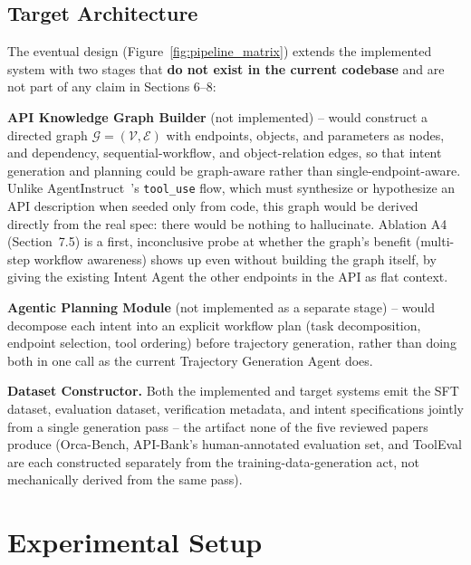 \documentclass[11pt]{article}
\begin{document}
\subsection{Target Architecture}
The eventual design (Figure~\ref{fig:pipeline_matrix}) extends the implemented system with two
stages that \textbf{do not exist in the current codebase} and are not part of any claim in
Sections 6--8:

\textbf{API Knowledge Graph Builder} (not implemented) -- would construct a directed graph
$\mathcal{G} = (\mathcal{V}, \mathcal{E})$ with endpoints, objects, and parameters as nodes, and
dependency, sequential-workflow, and object-relation edges, so that intent generation and planning
could be graph-aware rather than single-endpoint-aware. Unlike
AgentInstruct~\cite{mitra2024agentinstruct}'s \texttt{tool\_use} flow, which must synthesize or
hypothesize an API description when seeded only from code, this graph would be derived directly
from the real spec: there would be nothing to hallucinate. Ablation A4 (Section~7.5) is a first,
inconclusive probe at whether the graph's benefit (multi-step workflow awareness) shows up even
without building the graph itself, by giving the existing Intent Agent the other endpoints in the
API as flat context.

\textbf{Agentic Planning Module} (not implemented as a separate stage) -- would decompose each
intent into an explicit workflow plan (task decomposition, endpoint selection, tool ordering)
before trajectory generation, rather than doing both in one call as the current Trajectory
Generation Agent does.

\textbf{Dataset Constructor.} Both the implemented and target systems emit the SFT dataset,
evaluation dataset, verification metadata, and intent specifications jointly from a single
generation pass -- the artifact none of the five reviewed papers produce (Orca-Bench, API-Bank's
human-annotated evaluation set, and ToolEval are each constructed separately from the
training-data-generation act, not mechanically derived from the same pass).

\section{Experimental Setup}
\end{document}
